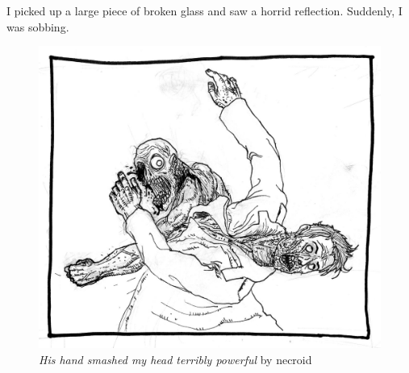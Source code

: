 I picked up a large piece of broken glass and saw a horrid
reflection. Suddenly, I was sobbing.

\begin{figure}[b]
  \includegraphics[width=\textwidth]{art/necroid-his_hand_smashed.jpg}
  \caption{{\em His hand smashed my head terribly powerful} by necroid}
\end{figure}


